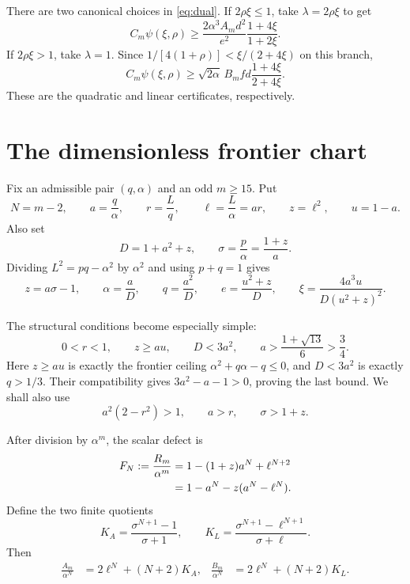 \documentclass[11pt]{article}
\begin{document}
There are two canonical choices in \eqref{eq:dual}.  If $2\rho\xi\le1$, take
$\lambda=2\rho\xi$ to get
\begin{equation}\label{eq:certA}
 C_m\psi(\xi,\rho)
 \ge
 \frac{2\alpha^3A_m d^2}{e^2}
 \frac{1+4\xi}{1+2\xi}.
\end{equation}
If $2\rho\xi>1$, take $\lambda=1$.  Since
$1/[4(1+\rho)]<\xi/(2+4\xi)$ on this branch,
\begin{equation}\label{eq:certB}
 C_m\psi(\xi,\rho)
 \ge
 \sqrt{2\alpha}\,B_m f d
 \frac{1+4\xi}{2+4\xi}.
\end{equation}
These are the quadratic and linear certificates, respectively.

\section{The dimensionless frontier chart}\label{sec:chart}

Fix an admissible pair $(q,\alpha)$ and an odd $m\ge15$.  Put
\begin{equation}\label{eq:chart}
 N=m-2,\qquad
 a=\frac q\alpha,\qquad
 r=\frac Lq,\qquad
 \ell=\frac L\alpha=ar,
 \qquad z=\ell^2,\qquad u=1-a.
\end{equation}
Also set
\begin{equation}\label{eq:D-sigma}
 D=1+a^2+z,
 \qquad
 \sigma=\frac p\alpha=\frac{1+z}{a}.
\end{equation}
Dividing $L^2=pq-\alpha^2$ by $\alpha^2$ and using $p+q=1$ gives
\begin{equation}\label{eq:chart-identities}
 z=a\sigma-1,\qquad
 \alpha=\frac aD,\qquad q=\frac{a^2}{D},\qquad
 e=\frac{u^2+z}{D},\qquad
 \xi=\frac{4a^3u}{D(u^2+z)^2}.
\end{equation}

The structural conditions become especially simple:
\begin{equation}\label{eq:domain}
 0<r<1,\qquad
 z\ge au,\qquad
 D<3a^2,\qquad
 a>\frac{1+\sqrt{13}}6>\frac34.
\end{equation}
Here $z\ge au$ is exactly the frontier ceiling
$\alpha^2+q\alpha-q\le0$, and $D<3a^2$ is exactly $q>1/3$.
Their compatibility gives $3a^2-a-1>0$, proving the last bound.  We shall
also use
\begin{equation}\label{eq:domain-consequences}
        a^2(2-r^2)>1,\qquad a>r,\qquad
        \sigma>1+z.
\end{equation}

After division by $\alpha^m$, the scalar defect is
\begin{align}
 F_N:=\frac{R_m}{\alpha^m}
 &=1-(1+z)a^N+\ell^{N+2}\notag\\
 &=1-a^N-z(a^N-\ell^N).\label{eq:defect-normal}
\end{align}
Define the two finite quotients
\begin{equation}\label{eq:KA-KL}
 K_A=\frac{\sigma^{N+1}-1}{\sigma+1},
 \qquad
 K_L=\frac{\sigma^{N+1}-\ell^{N+1}}{\sigma+\ell}.
\end{equation}
Then
\begin{align}
 \frac{A_m}{\alpha^N}&=2\ell^N+(N+2)K_A,
 &
 \frac{B_m}{\alpha^N}&=2\ell^N+(N+2)K_L.
 \label{eq:AB-normal}
\end{align}
\end{document}
